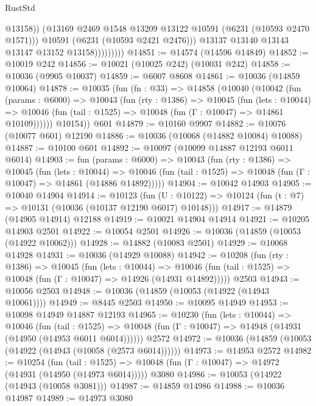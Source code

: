 \begin{lexlean}{RustStd}
\begin{coremodule}
{{                            @13158))
                        (@13169 @2469 @1548 @13209 @13122 @10591 (@6231 (@10593 @2470 @1571)))
                        @10591
                        (@6231 (@10593 @2421 @2476)))
                      @13137
                      @13140
                      @13143
                      @13147
                      @13152
                      @13158)))))))))
@14851 := @14574 (@14596 @14849)
@14852 := @10019 @242
@14856 := @10021 (@10025 @242) (@10031 @242)
@14858 := @10036 (@9905 @10037)
@14859 := @6007 @8608
@14861 := @10036 (@14859 @10064)
@14878 := @10035
    (fun (fn : @33) =>
    @14858
      (@10040
        (@10042
          (fun (params : @6000) =>
          @10043
            (fun (rty : @1386) =>
            @10045
              (fun (lets : @10044) =>
              @10046 (fun (tail : @1525) => @10048 (fun (Γ : @10047) => @14861 @10109))))))
        @10154))
    @601
@14879 := @10160 @9907
@14882 := @10076 (@10077 @601) @12190
@14886 := @10036 (@10068 (@14882 @10084) @10088)
@14887 := @10100 @601
@14892 := @10097 (@10099 @14887 @12193 @6011 @6014)
@14903 := fun (params : @6000) =>
  @10043
    (fun (rty : @1386) =>
    @10045
      (fun (lets : @10044) =>
      @10046 (fun (tail : @1525) => @10048 (fun (Γ : @10047) => @14861 (@14886 @14892)))))
@14904 := @10042 @14903
@14905 := @10040 @14904
@14914 := @10123
    (fun (U : @10122) => @10124 (fun (t : @7) => @10131 (@10036 (@10137 @12190 @6017) @10148)))
@14917 := @14879 (@14905 @14914) @12188
@14919 := @10021 @14904 @14914
@14921 := @10205 @14903 @2501
@14922 := @10054 @2501
@14926 := @10036 (@14859 (@10053 (@14922 @10062)))
@14928 := @14882 (@10083 @2501)
@14929 := @10068 @14928
@14931 := @10036 (@14929 @10088)
@14942 := @10208
    (fun (rty : @1386) =>
    @10045
      (fun (lets : @10044) =>
      @10046 (fun (tail : @1525) => @10048 (fun (Γ : @10047) => @14926 (@14931 @14892)))))
    @2503
@14943 := @10056 @2503
@14948 := @10036 (@14859 (@10053 (@14922 (@14943 @10061))))
@14949 := @8445 @2503
@14950 := @10095 @14949
@14953 := @10098 @14949 @14887 @12193
@14965 := @10230
    (fun (lets : @10044) =>
    @10046
      (fun (tail : @1525) =>
      @10048 (fun (Γ : @10047) => @14948 (@14931 (@14950 (@14953 @6011 @6014))))))
    @2572
@14972 := @10036 (@14859 (@10053 (@14922 (@14943 (@10058 (@2573 @6014))))))
@14973 := @14953 @2572
@14982 := @10254
    (fun (tail : @1525) => @10048 (fun (Γ : @10047) => @14972 (@14931 (@14950 (@14973 @6014)))))
    @3080
@14986 := @10053 (@14922 (@14943 (@10058 @3081)))
@14987 := @14859 @14986
@14988 := @10036 @14987
@14989 := @14973 @3080
}}
\end{coremodule}
\end{lexlean}
